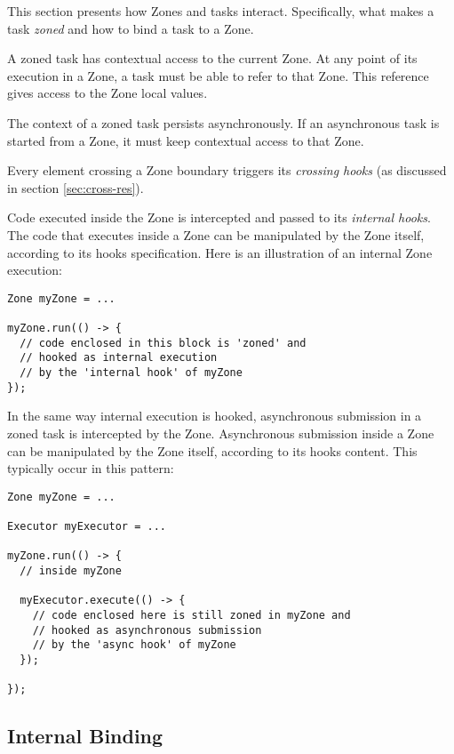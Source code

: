 This section presents how Zones and tasks interact. Specifically, what makes a task \emph{zoned} and how to bind a task to a Zone.

A zoned task has contextual access to the current Zone. At any point of its execution in a Zone, a task must be able to refer to that Zone. This reference gives access to the Zone local values.

The context of a zoned task persists asynchronously. If an asynchronous task is started from a Zone, it must keep contextual access to that Zone.

Every element crossing a Zone boundary triggers its \emph{crossing hooks} (as discussed in section \ref{sec:cross-res}).

Code executed inside the Zone is intercepted and passed to its \emph{internal hooks}. The code that executes inside a Zone can be manipulated by the Zone itself, according to its hooks specification. Here is an illustration of an internal Zone execution:

\begin{lstlisting}
Zone myZone = ...

myZone.run(() -> {
  // code enclosed in this block is 'zoned' and
  // hooked as internal execution
  // by the 'internal hook' of myZone
});
\end{lstlisting}

In the same way internal execution is hooked, asynchronous submission in a zoned task is intercepted by the Zone.
Asynchronous submission inside a Zone can be manipulated by the Zone itself, according to its hooks content. This typically occur in this pattern:

\begin{lstlisting}
Zone myZone = ...

Executor myExecutor = ...

myZone.run(() -> {
  // inside myZone

  myExecutor.execute(() -> {
    // code enclosed here is still zoned in myZone and
    // hooked as asynchronous submission
    // by the 'async hook' of myZone
  });
  
});
\end{lstlisting}

\subsection*{Internal Binding}

